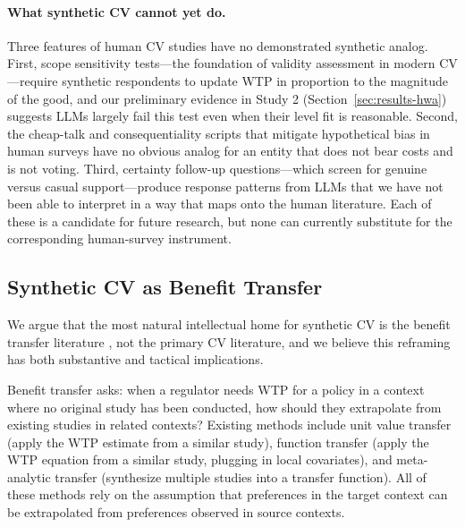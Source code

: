 \documentclass[12pt]{article}
\begin{document}
\paragraph{What synthetic CV cannot yet do.} Three features of
human CV studies have no demonstrated synthetic analog. First, scope
sensitivity tests---the foundation of validity assessment in modern CV
\parencite{Johnston2017}---require synthetic respondents to update WTP
in proportion to the magnitude of the good, and our preliminary evidence
in Study 2 (Section~\ref{sec:results-hwa}) suggests LLMs largely fail
this test even when their level fit is reasonable. Second, the
cheap-talk and consequentiality scripts that mitigate hypothetical bias
in human surveys have no obvious analog for an entity that does not bear
costs and is not voting. Third, certainty follow-up questions---which
screen for genuine versus casual support---produce response patterns
from LLMs that we have not been able to interpret in a way that maps
onto the human literature. Each of these is a candidate for future
research, but none can currently substitute for the corresponding
human-survey instrument.

\subsection{Synthetic CV as Benefit Transfer}\label{sec:disc-benefit-transfer}

We argue that the most natural intellectual home for synthetic CV is the
benefit transfer literature \parencite{Rosenberger2017, Loomis2015, Boyle2010},
not the primary CV literature, and we believe this reframing has both
substantive and tactical implications.

Benefit transfer asks: when a regulator needs WTP for a policy in a
context where no original study has been conducted, how should they
extrapolate from existing studies in related contexts? Existing methods
include unit value transfer (apply the WTP estimate from a similar
study), function transfer (apply the WTP equation from a similar study,
plugging in local covariates), and meta-analytic transfer (synthesize
multiple studies into a transfer function). All of these methods rely on
the assumption that preferences in the target context can be
extrapolated from preferences observed in source contexts.
\end{document}
